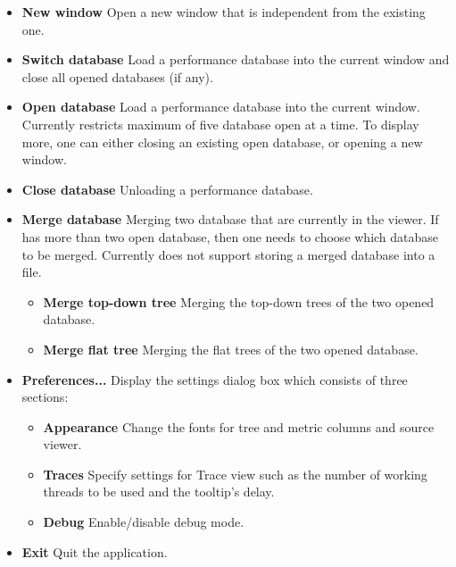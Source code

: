 \documentclass[english]{article}
\begin{document}
\begin{itemize}
\item \textbf{New window}
  Open a new  window that is independent from the existing one.

\item \textbf{Switch database}
  Load a performance database into the current  window and close all opened databases (if any). 

\item \textbf{Open database}
  Load a performance database into the current  window. 
  Currently  restricts maximum of five database open at a time. 
  To display more, one can either closing an existing open database, or opening a new  window.

\item \textbf{Close database}
  Unloading a performance database.

\item \textbf{Merge database}
  Merging two database that are currently in the viewer. If  has more than two
  open database, then one needs to choose which database to be merged.
  Currently  does not support storing a merged database into a file.

  \begin{itemize}
   \item \textbf{Merge top-down tree} Merging the top-down trees of the two opened database.
   \item \textbf{Merge flat tree} Merging the flat trees of the two opened database.
  \end{itemize}

\item \textbf{Preferences...}
  Display the settings dialog box which consists of three sections:
  \begin{itemize}
     \item \textbf{Appearance} Change the fonts for tree and metric columns and source viewer.
     \item \textbf{Traces} Specify settings for Trace view such as the number of working threads to be used and the tooltip's delay.
     \item \textbf{Debug} Enable/disable debug mode.
  \end{itemize}

\item \textbf{Exit}
  Quit the  application.

\end{itemize}
\end{document}
